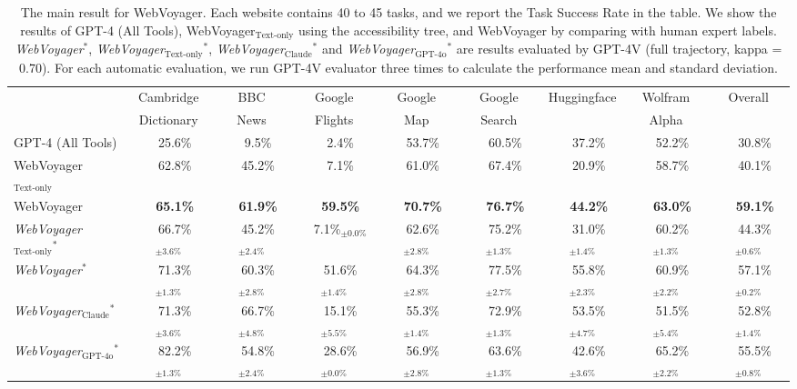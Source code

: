 \documentclass[11pt]{article}
\begin{document}
\begin{table}[t]
{{\begin{tabular}{@{}lcccccccc@{}}
\midrule \midrule
& Cambridge & BBC & Google & Google & Google & \multirow{2}{*}{Huggingface} & Wolfram & \multirow{2}{*}{Overall}  \\ 
& Dictionary & News & Flights & Map & Search & & Alpha & \\ 
\midrule 
GPT-4 (All Tools)  & \ \ 25.6\% & \ \ 9.5\%  & \ \ 2.4\%  & \ \ 53.7\% & \ \ 60.5\% & \ \ 37.2\%  & \ \ 52.2\% & \ \ 30.8\%  \\
WebVoyager$_{\text{Text-only}}$ & \ \ 62.8\% & \ \ 45.2\%  & \ \ 7.1\% & \ \  61.0\% & \ \ 67.4\% & \ \ 20.9\% & \ \ 58.7\% & \ \ 40.1\%  \\
WebVoyager  & \ \  \bf 65.1\% & \ \ \bf 61.9\%  & \ \ \bf 59.5\%  & \ \ \bf 70.7\% & \ \ \bf 76.7\% & \ \ \bf 44.2\%  & \ \ \bf 63.0\% & \ \ \bf 59.1\%  \\ 
\textit{WebVoyager$_{\text{Text-only}}$}$^*$ & \ \ 66.7\%$_{\pm 3.6\%}$ & \ \ 45.2\%$_{\pm 2.4\%}$ & \ \ 7.1\%$_{\pm 0.0\%}$ & \ \ 62.6\%$_{\pm 2.8\%}$ & \ \ 75.2\%$_{\pm 1.3\%}$ & \ \ 31.0\%$_{\pm 1.4\%}$ & \ \ 60.2\%$_{\pm 1.3\%}$ & \ \ 44.3\%$_{\pm 0.6\%}$ \\ 
\textit{WebVoyager}$^*$ & \ \ 71.3\%$_{\pm 1.3\%}$ & \ \  60.3\%$_{\pm 2.8\%}$  & \ \ 51.6\%$_{\pm 1.4\%}$  & \ \ 64.3\%$_{\pm 2.8\%}$ & \ \ 77.5\%$_{\pm 2.7\%}$ & \ \ 55.8\%$_{\pm 2.3\%}$  & \ \  60.9\%$_{\pm 2.2\%}$  & \ \  57.1\%$_{\pm 0.2\%}$  \\ 

\textit{WebVoyager$_{\text{Claude}}$}$^*$ & \ \ 71.3\%$_{\pm 3.6\%}$ & \ \  66.7\%$_{\pm 4.8\%}$  & \ \ 15.1\%$_{\pm 5.5\%}$  & \ \ 55.3\%$_{\pm 1.4\%}$ & \ \ 72.9\%$_{\pm 1.3\%}$ & \ \ 53.5\%$_{\pm 4.7\%}$  & \ \  51.5\%$_{\pm 5.4\%}$  & \ \  52.8\%$_{\pm 1.4\%}$  \\ 

\textit{WebVoyager$_{\text{GPT-4o}}$}$^*$ & \ \ 82.2\%$_{\pm 1.3\%}$ & \ \  54.8\%$_{\pm 2.4\%}$  & \ \ 28.6\%$_{\pm 0.0\%}$  & \ \ 56.9\%$_{\pm 2.8\%}$ & \ \ 63.6\%$_{\pm 1.3\%}$ & \ \ 42.6\%$_{\pm 3.6\%}$  & \ \  65.2\%$_{\pm 2.2\%}$  & \ \  55.5\%$_{\pm 0.8\%}$  \\
\bottomrule \bottomrule
\end{tabular}}}
\caption{
The main result for WebVoyager.
Each website contains 40 to 45 tasks, and we report the Task Success Rate in the table.
We show the results of GPT-4 (All Tools), WebVoyager$_{\text{Text-only}}$ using the accessibility tree, and WebVoyager by comparing with human expert labels. \textit{WebVoyager}$^*$, \textit{WebVoyager$_{\text{Text-only}}$}$^*$, \textit{WebVoyager$_{\text{Claude}}$}$^*$ and \textit{WebVoyager$_{\text{GPT-4o}}$}$^*$  are results evaluated by GPT-4V (full trajectory, kappa = 0.70). For each automatic evaluation, we run GPT-4V evaluator three times to calculate the performance mean and standard deviation.} 
\label{tab:noise}
\end{table}
\end{document}
